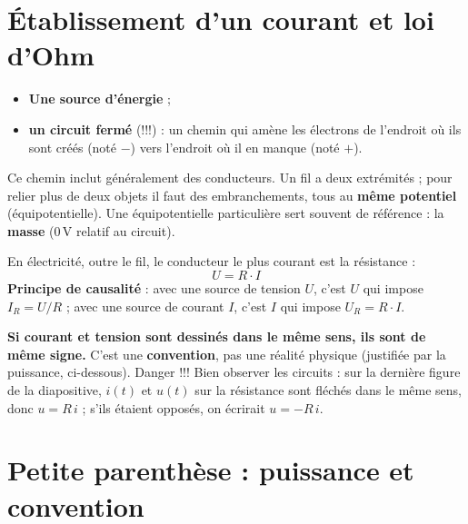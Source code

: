 \section{Établissement d'un courant et loi d'Ohm}


\begin{propbox}[title=Condition pour observer un courant]
\begin{itemize}
  \item \textbf{Une source d'énergie} ;
  \item \textbf{un circuit fermé} (!!!) : un chemin qui amène les électrons de l'endroit où
        ils sont créés (noté \og $-$\fg{}) vers l'endroit où il en manque (noté \og $+$\fg{}).
\end{itemize}
Ce chemin inclut généralement des conducteurs. Un fil a deux extrémités ; pour relier plus
de deux objets il faut des embranchements, tous au \textbf{même potentiel}
(équipotentielle). Une équipotentielle particulière sert souvent de référence : la
\textbf{masse} (0\,V relatif au circuit).
\end{propbox}

\begin{thmbox}[title=Loi d'Ohm]
En électricité, outre le fil, le conducteur le plus courant est la résistance :
\[ U = R\cdot I \]
\textbf{Principe de causalité} : avec une source de tension $U$, c'est $U$ qui impose
$I_R = U/R$ ; avec une source de courant $I$, c'est $I$ qui impose $U_R = R\cdot I$.
\end{thmbox}

\begin{warnbox}[title={Convention : même sens $\Rightarrow$ même signe}]
\textbf{Si courant et tension sont dessinés dans le même sens, ils sont de même signe.}
C'est une \textbf{convention}, pas une réalité physique (justifiée par la puissance,
ci-dessous). \og Danger !!! Bien observer les circuits\fg{} : sur la dernière figure de la
diapositive, $i(t)$ et $u(t)$ sur la résistance sont fléchés dans le même sens, donc
$u = R\,i$ ; s'ils étaient opposés, on écrirait $u = -R\,i$.
\end{warnbox}

\section{Petite parenthèse : puissance et convention}


